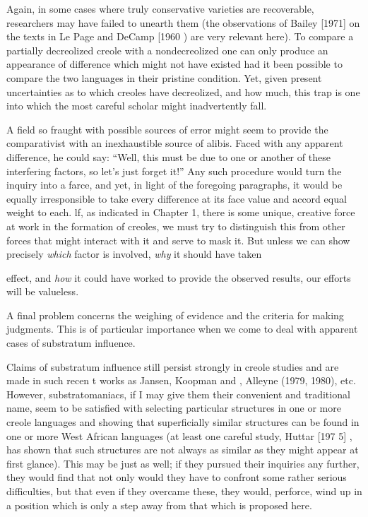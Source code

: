 Again, in some cases where truly conservative varieties are recoverable, researchers may have failed to unearth them (the obser\-vations of Bailey [1971] on the texts in Le Page and DeCamp [1960 ) are very relevant here). To compare a partially decreolized creole with a nondecreolized one can only produce an appearance of difference which might not have existed had it been possible to compare the two languages in their pristine condition. Yet, given present uncertainties as to which creoles have decreolized, and how much, this trap is one into which the most careful scholar might inadvertently fall.

A field so fraught with possible sources of error might seem to provide the comparativist with an inexhaustible source of alibis. Faced with any apparent difference, he could say: ``Well, this must be due to one or another of these interfering factors, so let's just forget it!'' Any such procedure would turn the inquiry into a farce, and yet, in light of the foregoing paragraphs, it would be equally irresponsible to take every difference at its face value and accord equal weight to each. lf, as indicated in Chapter 1, there is some unique, creative force at work in the formation of creoles, we must try to distinguish this from other forces that might interact with it and serve to mask it. But unless we can show precisely \textit{which} factor is involved, \textit{why} it should have taken

effect, and \textit{how} it could have worked to provide the observed results, our efforts will be valueless.


A final problem concerns the weighing of evidence and the criteria for making judgments. This is of particular importance when we come to deal with apparent cases of substratum influence.

Claims of substratum influence still persist strongly in creole studies and are made in such recen t works as Jansen, Koopman and \citet{Muysken1978}, Alleyne (1979, 1980), etc. However, substrato\-maniacs, if I may give them their convenient and traditional name, seem to be satisfied with selecting particular structures in one or more creole languages and showing that superficially similar structures can be found in one or more West African languages (at least one careful study, Huttar [197 5] , has shown that such structures are not always as similar as they might appear at first glance). This may be just as well; if they pursued their inquiries any further, they would find that not only would they have to confront some rather serious diffi\-culties, but that even if they overcame these, they would, perforce, wind up in a position which is only a step away from that which is proposed here.

